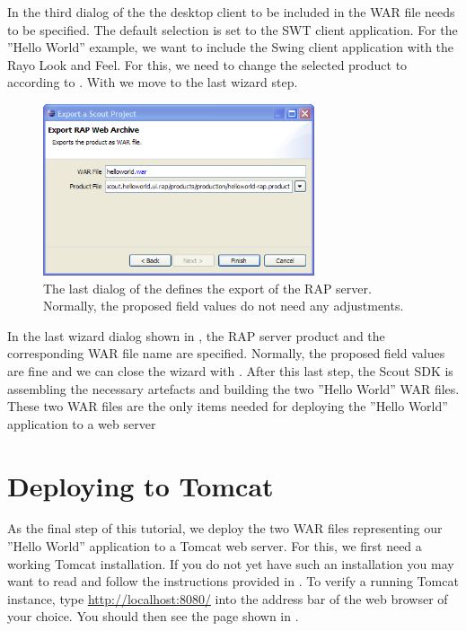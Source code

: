 \documentclass[a4paper,10pt,twoside]{book}
\begin{document}
In the third dialog of the  the desktop client to be included in the WAR file needs to be specified.
The default selection is set to the SWT client application.
For the ''Hello World'' example, we want to include the Swing client application with the Rayo Look and Feel.
For this, we need to change the selected product to  according to .
With  we move to the last wizard step.

\begin{figure}
\includegraphics[width=8cm]{export_wizard_4.png}
\caption{The last dialog of the  defines the export of the RAP server.
Normally, the proposed field values do not need any adjustments.}
\end{figure}

In the last wizard dialog shown in , the RAP server product and the corresponding WAR file name are specified.
Normally, the proposed field values are fine and we can close the wizard with .
After this last step, the Scout SDK is assembling the necessary artefacts and building the two ''Hello World'' WAR files.
These two WAR files are the only items needed for deploying the ''Hello World'' application to a web server

\section{Deploying to Tomcat}

As the final step of this tutorial, we deploy the two WAR files representing our ''Hello World'' application to a Tomcat web server.
For this, we first need a working Tomcat installation.
If you do not yet have such an installation you may want to read and follow the instructions provided in .
To verify a running Tomcat instance, type \url{http://localhost:8080/} into the address bar of the web browser of your choice.
You should then see the page shown in .
\end{document}

